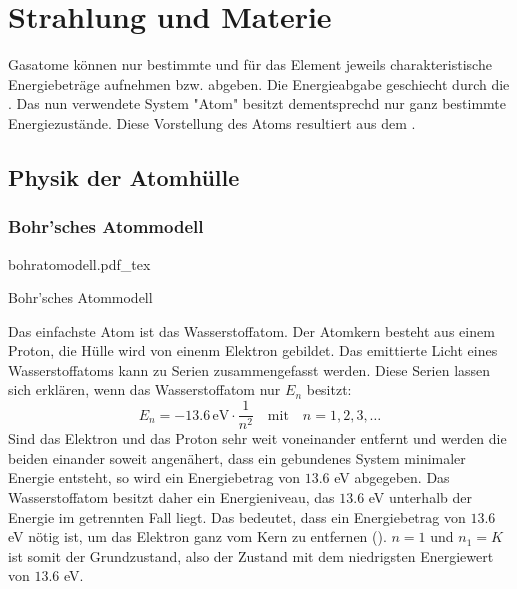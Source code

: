 \documentclass{tuftebook}
\begin{document}
\section{Strahlung und Materie}
    \noindent Gasatome können nur bestimmte und für das Element jeweils charakteristische Energiebeträge aufnehmen bzw. abgeben. Die Energieabgabe geschiecht durch die . Das nun verwendete System "Atom" besitzt dementsprechd nur ganz bestimmte Energiezustände. Diese Vorstellung des Atoms resultiert aus dem .
    


\subsection{Physik der Atomhülle}
    \subsubsection{Bohr'sches Atommodell}
    \begin{marginfigure}
        \centering
        \def\svgwidth{\linewidth}
        {bohratomodell.pdf_tex}
        \caption{Bohr'sches Atommodell}
        \label{fig:bohrmodell}
    \end{marginfigure}
    Das einfachste Atom ist das Wasserstoffatom. Der Atomkern besteht aus einem Proton, die Hülle wird von einenm Elektron gebildet. Das emittierte Licht eines Wasserstoffatoms kann zu Serien zusammengefasst werden. Diese Serien lassen sich erklären, wenn das Wasserstoffatom nur  $E_n$ besitzt: \[E_n=-13.6\,\text{eV}\cdot\frac{1}{n^2}\quad\text{mit}\quad n=1,2,3,\ldots\]
    Sind das Elektron und das Proton sehr weit voneinander entfernt und werden die beiden einander soweit angenähert, dass ein gebundenes System minimaler Energie entsteht, so wird ein Energiebetrag von $13.6$ eV abgegeben. Das Wasserstoffatom besitzt daher ein Energieniveau, das $13.6$ eV unterhalb der Energie im getrennten Fall liegt.
    Das bedeutet, dass ein Energiebetrag von $13.6$ eV nötig ist, um das Elektron ganz vom Kern zu entfernen (). $n=1$ und $n_1=K$ ist somit der Grundzustand, also der Zustand mit dem niedrigsten Energiewert von $13.6$ eV.
    
\end{document}
